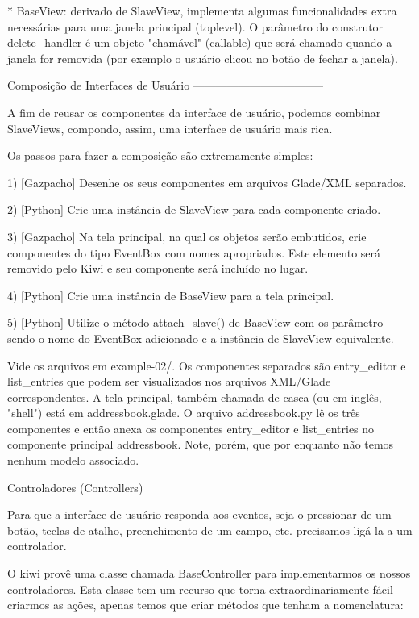 * BaseView: derivado de SlaveView, implementa algumas funcionalidades
   extra necessárias para uma janela principal (toplevel). O parâmetro
   do construtor delete_handler é um objeto "chamável" (callable) que
   será chamado quando a janela for removida (por exemplo o usuário
   clicou no botão de fechar a janela).



   Composição de Interfaces de Usuário
   -----------------------------------

A fim de reusar os componentes da interface de usuário, podemos
combinar SlaveViews, compondo, assim, uma interface de usuário mais
rica.

Os passos para fazer a composição são extremamente simples:


 1) [Gazpacho] Desenhe os seus componentes em arquivos Glade/XML
    separados.

 2) [Python] Crie uma instância de SlaveView para cada componente criado.

 3) [Gazpacho] Na tela principal, na qual os objetos serão embutidos,
    crie componentes do tipo EventBox com nomes apropriados. Este
    elemento será removido pelo Kiwi e seu componente será incluído no
    lugar.

 4) [Python] Crie uma instância de BaseView para a tela principal.

 5) [Python] Utilize o método attach_slave() de BaseView com os
    parâmetro sendo o nome do EventBox adicionado e a instância de
    SlaveView equivalente.

Vide os arquivos em example-02/. Os componentes separados são
entry_editor e list_entries que podem ser visualizados nos arquivos
XML/Glade correspondentes. A tela principal, também chamada de casca
(ou em inglês, "shell") está em addressbook.glade. O arquivo
addressbook.py lê os três componentes e então anexa os componentes
entry_editor e list_entries no componente principal addressbook. Note,
porém, que por enquanto não temos nenhum modelo associado.


Controladores (Controllers)
~~~~~~~~~~~~~~~~~~~~~~~~~~~

Para que a interface de usuário responda aos eventos, seja o
pressionar de um botão, teclas de atalho, preenchimento de um campo,
etc. precisamos ligá-la a um controlador.

O kiwi provê uma classe chamada BaseController para implementarmos os
nossos controladores. Esta classe tem um recurso que torna
extraordinariamente fácil criarmos as ações, apenas temos que criar
métodos que tenham a nomenclatura:

